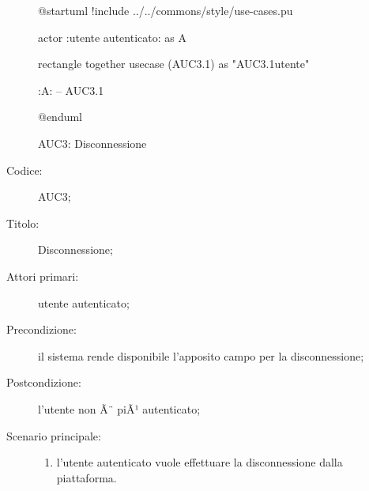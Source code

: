 \documentclass[../../../analisi-dei-requisiti.tex]{subfiles}
\begin{document}
\begin{figure}[H]
  \centering
  \begin{plantuml}
  @startuml
  !include ../../commons/style/use-cases.pu

  actor :utente autenticato: as A

  rectangle {
    together {
      usecase (AUC3.1) as "AUC3.1\nDisconnessione utente"
    }
  }

  :A: -- AUC3.1

  @enduml
  \end{plantuml}
  \caption{AUC3: Disconnessione}%
  \label{fig:auc3}
\end{figure}

\begin{description}
  \item[Codice:] AUC3;
  \item[Titolo:] Disconnessione;
  \item[Attori primari:] utente autenticato;
  \item[Precondizione:] il sistema rende disponibile l'apposito campo per la disconnessione;
  \item[Postcondizione:] l'utente non Ã¨ piÃ¹ autenticato;
  \item[Scenario principale:]
  \begin{enumerate}
    \item l'utente autenticato vuole effettuare la disconnessione dalla piattaforma.
  \end{enumerate}
\end{description}
\end{document}
